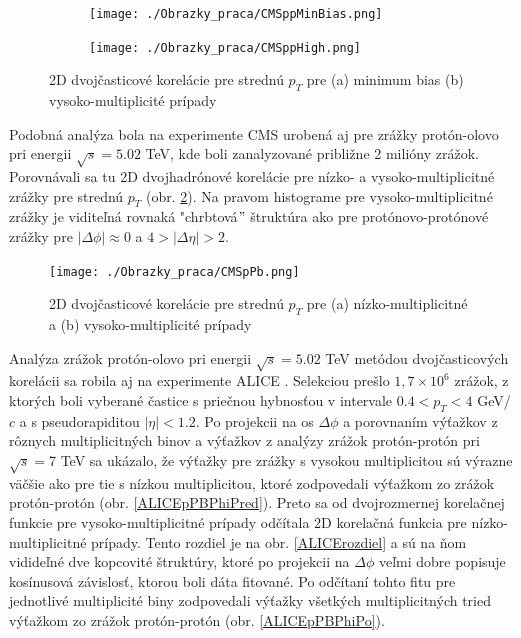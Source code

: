 \documentclass[thesismargins, thesislinespacing]{rnthesis}
\begin{document}
\begin{figure}[hbtp!]
	\centering
	\begin{subfigure}{0.5\textwidth}
		\centering
		\texttt{[image: ./Obrazky\_praca/CMSppMinBias.png]}
		\caption{}
	\end{subfigure}%
	\begin{subfigure}{0.5\textwidth}
		\centering
		\texttt{[image: ./Obrazky\_praca/CMSppHigh.png]}
		\caption{}
	\end{subfigure}
	\caption{2D dvojčasticové korelácie pre strednú $p_{T}$ pre (a) minimum bias (b) vysoko-multiplicité prípady\cite{CMSpp}}
	\label{CMSpp}
\end{figure}

Podobná analýza bola na experimente CMS urobená aj pre zrážky protón-olovo pri energii $\sqrt{s}=5.02$ TeV, kde boli zanalyzované približne 2 milióny zrážok. Porovnávali sa tu 2D dvojhadrónové korelácie pre nízko- a vysoko-multiplicitné zrážky pre strednú $p_{T}$ (obr. \ref{CMSpPb}). Na pravom histograme pre vysoko-multiplicitné zrážky je viditeľná rovnaká "chrbtová$\mathrm{"}$ štruktúra ako pre protónovo-protónové zrážky  pre $|\Delta \phi|\approx0$  a $4>|\Delta \eta|>2$.

\begin{figure}[hbtp!]
		\centering
		\texttt{[image: ./Obrazky\_praca/CMSpPb.png]}
	\caption{2D dvojčasticové korelácie pre strednú $p_{T}$ pre (a) nízko-multiplicitné a (b) vysoko-multiplicité prípady\cite{CMSpPb}}
	\label{CMSpPb}
\end{figure}

Analýza zrážok protón-olovo pri energii $\sqrt{s}=5.02$ TeV metódou dvojčasticových korelácii sa robila aj na experimente ALICE \cite{AlicepPb}. Selekciou prešlo $1,7\times10^6$ zrážok, z ktorých boli vyberané častice s priečnou hybnosťou v intervale $0.4<p_T<4$ GeV/$c$ a s pseudorapiditou $|\eta|<1.2$. Po projekcii na os $\Delta \phi$ a porovnaním výťažkov z rôznych multiplicitných binov a výťažkov z analýzy zrážok protón-protón pri $\sqrt{s}=$7 TeV sa ukázalo, že výťažky pre zrážky s vysokou multiplicitou sú výrazne väčšie ako pre tie s nízkou multiplicitou, ktoré zodpovedali výťažkom zo zrážok protón-protón (obr. \ref{ALICEpPBPhiPred}). Preto sa od dvojrozmernej korelačnej funkcie pre vysoko-multiplicitné prípady odčítala 2D korelačná funkcia pre nízko-multiplicitné prípady. Tento rozdiel je na obr. \ref{ALICErozdiel} a sú na ňom vidideľné dve kopcovité štruktúry, ktoré po projekcii na $\Delta \phi$ veľmi dobre popisuje kosínusová závislosť, ktorou boli dáta fitované. Po odčítaní tohto fitu pre jednotlivé multiplicité biny zodpovedali výťažky všetkých multiplicitných tried výťažkom zo zrážok protón-protón (obr. \ref{ALICEpPBPhiPo}).
\end{document}

